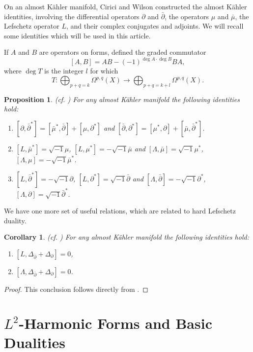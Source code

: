 \documentclass[12pt, twoside]{article}
\newtheorem{corollary}[theorem]{Corollary}
\newtheorem{proposition}[theorem]{Proposition}
\theoremstyle{definition}
\numberwithin{equation}{section}
\def \De {\Delta}
\def \La {\Lambda}
\def\Om{\Omega}
\def\pa{\partial}
\begin{document}
On an almost K\"{a}hler manifold, Cirici and Wilson \cite{CW20} constructed the almost K\"{a}hler identities, involving the differential operators $\pa$ and $\bar{\pa}$, the operators $\mu$ and $\bar{\mu}$,  the Lefschetz operator $L$, and their complex conjugates and adjoints. We will recall some identities which  will be used in this article.
	
If $A$ and $B$ are operators on forms, defined the graded commutator
	$$[A,B]=AB-(-1)^{\deg A\cdot \deg B}BA,$$
	where $\deg T$ is the integer $l$ for which $$T:\bigoplus_{p+q=k}\Om^{p,q}(X)\rightarrow\bigoplus_{p+q=k+l}\Om^{p,q}(X).$$
	\begin{proposition}(cf. \cite{CW20}) \label{aki}
		For any almost K\"{a}hler manifold the following identities hold:
			\begin{enumerate}
			\item[(1)]  $[\pa,\bar{\pa}^{\ast}]=[\bar{\mu}^{\ast},\bar{\pa}]+[\mu,\pa^{\ast}]$ and $[\bar{\pa},\pa^{\ast}]=[\mu^{\ast},\pa]+[\bar{\mu},\bar{\pa}^{\ast}]$.
			\item[(2)]  $[L,\bar{\mu}^{\ast}]=\sqrt{-1}\mu$, $[L,\mu^{\ast}]=-\sqrt{-1}\bar{\mu}$ and   $[\La,\bar{\mu}]=\sqrt{-1}\mu^{\ast}$, $[\La,\mu]=-\sqrt{-1}\bar{\mu}^{\ast}$.
			\item[(3)] $[L,\bar{\pa}^{\ast}]=-\sqrt{-1}\pa$, $[L,\pa^{\ast}]=\sqrt{-1}\bar{\pa}$ and  $[\La,\bar{\pa}]=-\sqrt{-1}\pa^{\ast}$, $[\La,\pa]=\sqrt{-1}\bar{\pa}^{\ast}$.
	\end{enumerate}
	\end{proposition}
We have one more set of useful relations, which are related to hard Lefschetz duality.
	\begin{corollary}(cf. \cite[Corollary 3.5]{CW20}) \label{C6}
	For any almost K\"{a}hler manifold the following identities hold:
	\begin{enumerate}
		\item[(1)] $[L,\De_{\bar{\pa}}+\De_{\pa}]=0$,
		\item[(2)] $[\La,\De_{\bar{\pa}}+\De_{\pa}]=0$.
	\end{enumerate}
\end{corollary}
\begin{proof}
This conclusion follows directly from \cite[Corollary 3.5]{CW20}.	
\end{proof}


	\section{$L^{2}$-Harmonic Forms and Basic Dualities}
\end{document}
